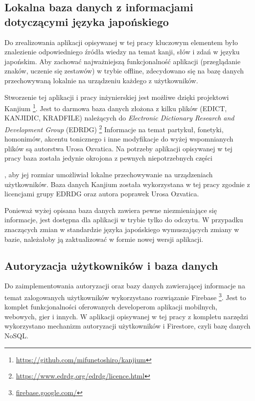\documentclass[a4paper,twoside,12pt]{book}
\newcommand{\ksremark}[1]{%
{%
{\color{brickred}{[#1]}}}%
\addcontentsline{rks}{uwagas}{\protect{#1}}%
}
\newcommand{\obcy}[1]{\emph{#1}}
\newcommand{\english}[1]{{\selectlanguage{british}\obcy{#1}}}
\begin{document}
\subsection{Lokalna baza danych z informacjami dotyczącymi języka japońskiego}

Do zrealizowania aplikacji opisywanej w tej pracy kluczowym elementem było znalezienie odpowiedniego źródła wiedzy na temat kanji, słów i zdań w języku japońskim. Aby zachować najważniejszą funkcjonalność aplikacji (przeglądanie znaków, uczenie się zestawów) w trybie offline, zdecydowano się na bazę danych przechowywaną lokalnie na urządzeniu każdego z użytkowników. 

Stworzenie tej aplikacji i pracy inżynierskiej jest możliwe dzięki projektowi Kanjium \footnote{\url{https://github.com/mifunetoshiro/kanjium}}. Jest to darmowa baza danych złożona z kilku plików (EDICT, KANJIDIC, KRADFILE) należących do  \english{Electronic Dictionary Research and Development Group} (EDRDG) \footnote{\url{https://www.edrdg.org/edrdg/licence.html}} Informacje na temat partykuł, fonetyki, homonimów, akcentu tonicznego i inne modyfikacje do wyżej wspomnianych plików są autorstwa Urosa Ozvatica. Na potrzeby aplikacji opisywanej w tej pracy baza została jedynie okrojona z pewnych niepotrzebnych części 
\ksremark{np. czego? todo}
, aby jej rozmiar umożliwiał lokalne przechowywanie na urządzeniach użytkowników. Baza danych Kanjium została wykorzystana w tej pracy zgodnie z licencjami grupy EDRDG oraz autora poprawek Urosa Ozvatica.

Ponieważ wyżej opisana baza danych zawiera pewne niezmieniające się informacje, jest dostępna dla aplikacji w trybie tylko do odczytu. W przypadku znaczących zmian w standardzie języka japońskiego wymuszających zmiany w bazie, należałoby ją zaktualizować w formie nowej wersji aplikacji.

\subsection{Autoryzacja użytkowników i baza danych}
Do zaimplementowania autoryzacji oraz bazy danych zawierającej informacje na temat zalogowanych użytkowników wykorzystano rozwiązanie Firebase \footnote{\url{firebase.google.com/}}. Jest to komplet funkcjonalności oferowanych developerom aplikacji mobilnych, webowych, gier i innych. W aplikacji opisywanej w tej pracy z kompletu narzędzi wykorzystano mechanizm autoryzacji użytkowników i Firestore, czyli bazę danych NoSQL. 
\end{document}
